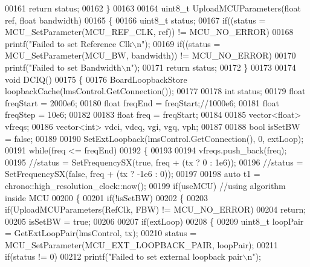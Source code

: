 \begin{DoxyCode}
00161     \textcolor{keywordflow}{return} status;
00162 \}
00163 
00164 uint8\_t UploadMCUParameters(\textcolor{keywordtype}{float} ref, \textcolor{keywordtype}{float} bandwidth)
00165 \{
00166     uint8\_t status;
00167     \textcolor{keywordflow}{if}((status = MCU_SetParameter(MCU_REF_CLK, ref)) != MCU_NO_ERROR)
00168         printf(\textcolor{stringliteral}{"Failed to set Reference Clk\(\backslash\)n"});
00169     \textcolor{keywordflow}{if}((status = MCU_SetParameter(MCU_BW, bandwidth)) != MCU_NO_ERROR)
00170         printf(\textcolor{stringliteral}{"Failed to set Bandwidth\(\backslash\)n"});
00171     \textcolor{keywordflow}{return} status;
00172 \}
00173 
00174 \textcolor{keywordtype}{void} DCIQ()
00175 \{
00176     BoardLoopbackStore loopbackCache(lmsControl.GetConnection());
00177 
00178     \textcolor{keywordtype}{int} status;
00179     \textcolor{keywordtype}{float} freqStart = 2000e6;
00180     \textcolor{keywordtype}{float} freqEnd = freqStart;\textcolor{comment}{//1000e6;}
00181     \textcolor{keywordtype}{float} freqStep = 10e6;
00182 
00183     \textcolor{keywordtype}{float} freq = freqStart;
00184 
00185     vector<float> vfreqs;
00186     vector<int> vdci, vdcq, vgi, vgq, vph;
00187 
00188     \textcolor{keywordtype}{bool} isSetBW = \textcolor{keyword}{false};
00189 
00190     SetExtLoopback(lmsControl.GetConnection(), 0, extLoop);
00191     \textcolor{keywordflow}{while}(freq <= freqEnd)
00192     \{
00193 
00194         vfreqs.push\_back(freq);
00195         \textcolor{comment}{//status = SetFrequencySX(true, freq + (tx ? 0 : 1e6));}
00196         \textcolor{comment}{//status = SetFrequencySX(false, freq + (tx ? -1e6 : 0));}
00197 
00198         \textcolor{keyword}{auto} t1 = chrono::high\_resolution\_clock::now();
00199         \textcolor{keywordflow}{if}(useMCU) \textcolor{comment}{//using algorithm inside MCU}
00200         \{
00201             \textcolor{keywordflow}{if}(!isSetBW)
00202             \{
00203                 \textcolor{keywordflow}{if}(UploadMCUParameters(RefClk, FBW) != MCU_NO_ERROR)
00204                     \textcolor{keywordflow}{return};
00205                 isSetBW = \textcolor{keyword}{true};
00206 
00207                 \textcolor{keywordflow}{if}(extLoop)
00208                 \{
00209                     uint8\_t loopPair = GetExtLoopPair(lmsControl, tx);
00210                     status = MCU_SetParameter(MCU_EXT_LOOPBACK_PAIR, loopPair);
00211                     \textcolor{keywordflow}{if}(status != 0)
00212                         printf(\textcolor{stringliteral}{"Failed to set external loopback pair\(\backslash\)n"});

\end{DoxyCode}

